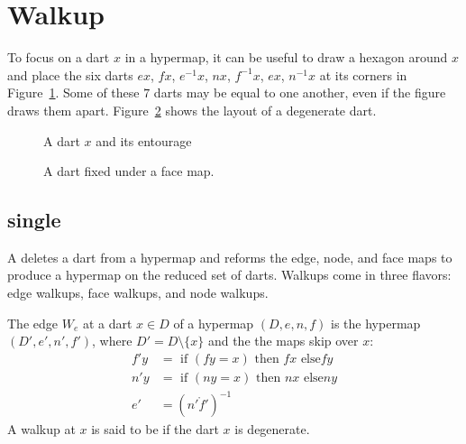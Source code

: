 \section{Walkup}

To focus on a dart $x$ in a
hypermap, it can be useful to draw a hexagon around $x$ and place
the six darts $e x$,
$f x$, $e^{-1} x$, $n x$,  $f^{-1} x$, $e x$, $n^{-1} x$  at its corners
in Figure~\ref{fig:dart+}.  Some of these $7$ darts may be
equal to one another, even if the figure draws them apart.
Figure~\ref{fig:dart-fix} shows the layout of a degenerate dart.
%

\begin{figure}[htb]
\centering
{}
\caption{A dart $x$ and its entourage}
\label{fig:dart+}
\end{figure}

\begin{figure}[htb]
\centering
{}
\caption{A dart fixed under a face map.}
\label{fig:dart-fix}
\end{figure}

\subsection{single}

A  deletes
a dart from a hypermap and reforms the edge, node, and face
maps to produce a hypermap on the reduced set of darts.  Walkups
come in three flavors: edge walkups, face walkups,
and node walkups.

\begin{definition}
The edge 
$W_e$ at  a dart $x\in D$ of a hypermap $(D,e,n,f)$ is the hypermap
$(D',e',n',f')$, where $D' = D\setminus\{x\}$ and the
the maps skip over $x$:
\begin{displaymath}
\begin{array}{lll}
f' y &= \text{ if } (f y =  x) \text{ then } f x \text{ else
} f y\\
n' y &= \text{ if } (n y = x) \text{ then } n x \text{ else
} n y\\
e' &= (n'\ocirc f')^{-1}
\end{array}
\end{displaymath}
A walkup at $x$ is said to be  if the dart $x$ is
degenerate.  
%
%
%
%
%
\end{definition}

